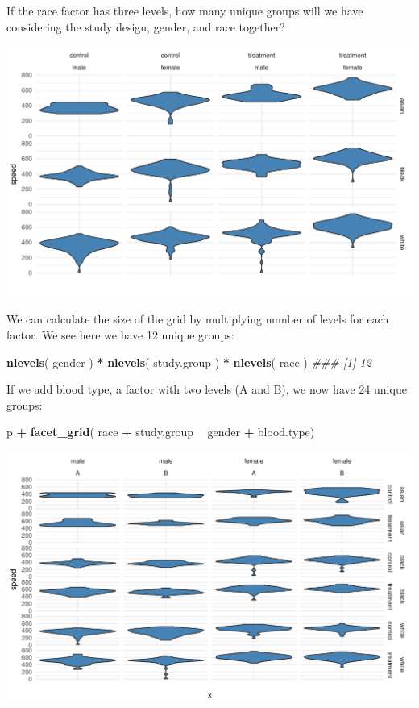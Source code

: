 \documentclass[]{book}
\newenvironment{Shaded}{\begin{snugshade}}{\end{snugshade}}
\newcommand{\CommentTok}[1]{\textcolor[rgb]{0.56,0.35,0.01}{\textit{#1}}}
\newcommand{\KeywordTok}[1]{\textcolor[rgb]{0.13,0.29,0.53}{\textbf{#1}}}
\newcommand{\NormalTok}[1]{#1}
\newcommand{\OperatorTok}[1]{\textcolor[rgb]{0.81,0.36,0.00}{\textbf{#1}}}
\newcommand{\StringTok}[1]{\textcolor[rgb]{0.31,0.60,0.02}{#1}}
\theoremstyle{definition}
\theoremstyle{definition}
\theoremstyle{definition}
\theoremstyle{remark}
\begin{document}
If the race factor has three levels, how many unique groups will we have
considering the study design, gender, and race together?

\begin{center}\includegraphics[width=0.7\linewidth]{DS4PS-I_files/figure-latex/unnamed-chunk-148-1} \end{center}

We can calculate the size of the grid by multiplying number of levels
for each factor. We see here we have 12 unique groups:

\begin{Shaded}
\begin{Highlighting}[]

\KeywordTok{nlevels}\NormalTok{( gender ) }\OperatorTok{*}\StringTok{ }\KeywordTok{nlevels}\NormalTok{( study.group ) }\OperatorTok{*}\StringTok{ }\KeywordTok{nlevels}\NormalTok{( race )}
\CommentTok{### [1] 12}
\end{Highlighting}
\end{Shaded}

If we add blood type, a factor with two levels (A and B), we now have 24
unique groups:

\begin{Shaded}
\begin{Highlighting}[]

\NormalTok{p }\OperatorTok{+}\StringTok{ }\KeywordTok{facet_grid}\NormalTok{( race }\OperatorTok{+}\StringTok{ }\NormalTok{study.group }\OperatorTok{~}\StringTok{ }\NormalTok{gender }\OperatorTok{+}\StringTok{ }\NormalTok{blood.type) }
\end{Highlighting}
\end{Shaded}

\begin{center}\includegraphics[width=0.7\linewidth]{DS4PS-I_files/figure-latex/unnamed-chunk-150-1} \end{center}
\end{document}

